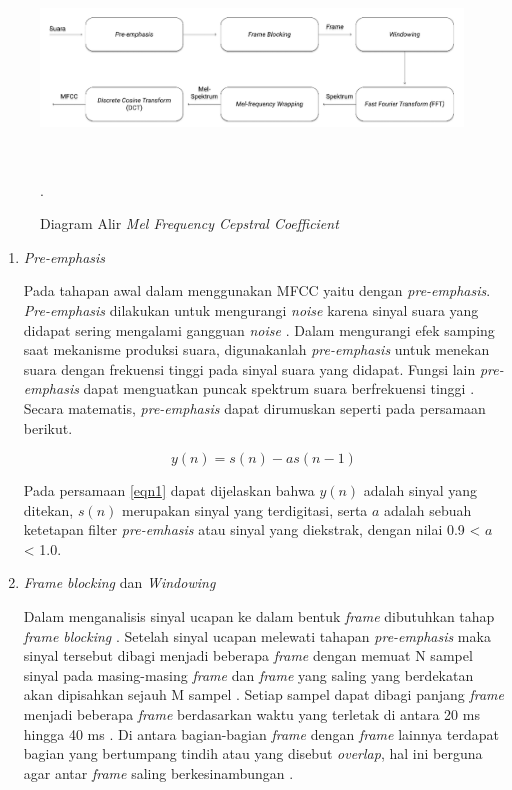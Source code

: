 \begin{figure}[H]
\centering
\shadowbox
{\includegraphics [width = 14cm, height= 5cm]{gambar/alir_mfcc}}
\caption{Diagram Alir \textit{Mel Frequency Cepstral Coefficient}}.
\label{alir_mfcc}
\end{figure}

\begin{enumerate}
\item \textit{Pre-emphasis}
\par Pada tahapan awal dalam menggunakan MFCC yaitu dengan \textit{pre-emphasis}. \textit{Pre-emphasis} dilakukan untuk mengurangi \textit{noise} karena sinyal suara yang didapat sering mengalami gangguan \textit{noise} \citep{heriyanto2018}. Dalam mengurangi efek samping saat mekanisme produksi suara, digunakanlah \textit{pre-emphasis} untuk menekan suara dengan frekuensi tinggi pada sinyal suara yang didapat. Fungsi lain \textit{pre-emphasis} dapat menguatkan puncak spektrum suara berfrekuensi tinggi \citep{efendi2019}. Secara matematis, \textit{pre-emphasis} dapat dirumuskan seperti pada persamaan berikut.

\begin{equation}
	y(n) = s(n) - as(n-1)
	\label{eqn1}
\end{equation}

\par Pada persamaan \ref{eqn1} dapat dijelaskan bahwa $y(n)$ adalah sinyal yang ditekan, $s(n)$ merupakan sinyal yang terdigitasi, serta $a$ adalah sebuah ketetapan filter \textit{pre-emhasis} atau sinyal yang diekstrak, dengan nilai 0.9 < $a$ < 1.0.

\item \textit{Frame blocking} dan \textit{Windowing}
\par Dalam menganalisis sinyal ucapan ke dalam bentuk \textit{frame} dibutuhkan tahap \textit{frame blocking} \citep{heriyanto2018}. Setelah sinyal ucapan melewati tahapan \textit{pre-emphasis} maka sinyal tersebut dibagi menjadi beberapa \textit{frame} dengan memuat N sampel sinyal pada masing-masing \textit{frame} dan \textit{frame} yang saling yang berdekatan akan dipisahkan sejauh M sampel \citep{laksono2018}. Setiap sampel dapat dibagi panjang \textit{frame} menjadi beberapa \textit{frame} berdasarkan waktu yang terletak di antara 20 ms hingga 40 ms \citep{laksono2018}. Di antara bagian-bagian \textit{frame} dengan \textit{frame} lainnya terdapat bagian yang bertumpang tindih atau yang disebut \textit{overlap}, hal ini berguna agar antar \textit{frame} saling berkesinambungan \citep{efendi2019}.


\end{enumerate}
